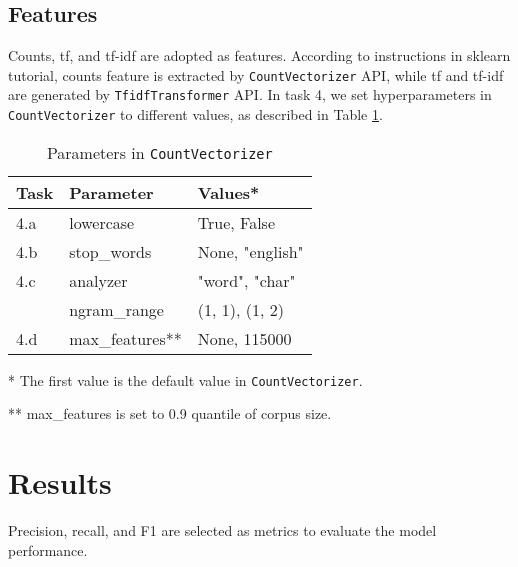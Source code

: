 \documentclass[12pt]{article}
\begin{document}
\subsection{Features}
Counts, tf, and tf-idf are adopted as features. According to instructions in sklearn tutorial, counts feature is extracted by \texttt{CountVectorizer} API, while tf and tf-idf are generated by \texttt{TfidfTransformer} API. In task 4, we set hyperparameters in \texttt{CountVectorizer} to different values, as described in Table \ref{tab:count}.
\begin{table}[h]
    \centering
    \caption{Parameters in \texttt{CountVectorizer}}
    \label{tab:count}
    \begin{threeparttable}
    \begin{tabular}{lll}
        \toprule
        \textbf{Task} & \textbf{Parameter} & \textbf{Values}*\\
        \midrule
        4.a & lowercase\phantom{space} & True, False \phantom{spacespace}\\
        4.b & stop\_words & None, "english"\\ 
        4.c & analyzer & "word", "char"\\
         & ngram\_range & (1, 1), (1, 2)\\
        4.d & max\_features**  & None, 115000\\
        \bottomrule
    \end{tabular}
    \begin{tablenotes}
        \footnotesize
        \item[*] The first value is the default value in \texttt{CountVectorizer}.
        \item[**] max\_features is set to 0.9 quantile of corpus size.
    \end{tablenotes}
    \end{threeparttable}
\end{table}

\section{Results}
Precision, recall, and F1 are selected as metrics to evaluate the model performance.
\end{document}

